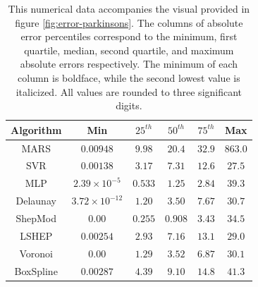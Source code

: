 \documentclass[smallextended,final]{svjour3}       %
\begin{document}
\begin{appendix}
\begin{table}
  \centering
  \begin{tabular}{c|c|c|c|c|c}
    \hline
    Algorithm & Min & $25^{th}$ & $50^{th}$ & $75^{th}$ & Max\\
    \hline
    MARS & $0.00948$ & $9.98$ & $20.4$ & $32.9$ & $863.0$\\
    SVR & $0.00138$ & $3.17$ & $7.31$ & $12.6$ & $\mathbf{27.5}$\\
    MLP & $2.39 \times 10^{-5}$ & $\mathit{0.533}$ & $\mathit{1.25}$ & $\mathbf{2.84}$ & $39.3$\\
    Delaunay & $\mathit{3.72 \times 10^{-12}}$ & $1.20$ & $3.50$ & $7.67$ & $30.7$\\
    ShepMod & $\mathbf{0.00}$ & $\mathbf{0.255}$ & $\mathbf{0.908}$ & $\mathit{3.43}$ & $34.5$\\
    LSHEP & $0.00254$ & $2.93$ & $7.16$ & $13.1$ & $\mathit{29.0}$\\
    Voronoi & $\mathbf{0.00}$ & $1.29$ & $3.52$ & $6.87$ & $30.1$\\
    BoxSpline & $0.00287$ & $4.39$ & $9.10$ & $14.8$ & $41.3$\\
    \hline
  \end{tabular}
  \caption{This numerical data accompanies the visual provided in figure \ref{fig:error-parkinsons}. The columns of absolute error percentiles correspond to the minimum, first quartile, median, second quartile, and maximum absolute errors respectively. The minimum of each column is boldface, while the second lowest value is italicized. All values are rounded to three significant digits.}
  \label{table:error-parkinsons}
\end{table}


\end{appendix}
\end{document}
